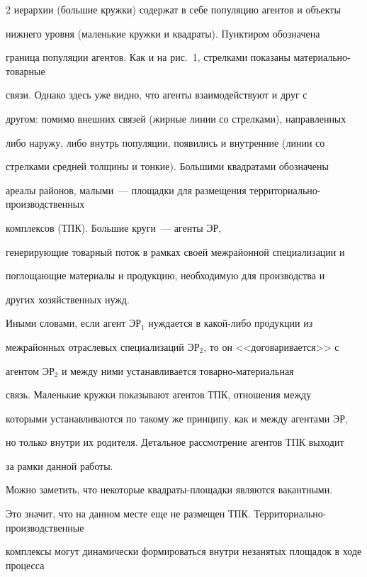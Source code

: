 \begin{multicols}{2}
иерархии (большие кружки) содержат в себе популяцию агентов и объекты 


нижнего уровня (маленькие кружки и квадраты). Пунктиром обозначена 


граница популяции агентов. Как и на рис.~1, стрелками показаны ма\-те\-ри\-аль\-но-то\-вар\-ные 


связи. Однако здесь уже видно, что агенты взаимодействуют и друг с 


другом: помимо внешних связей (жирные линии со стрелками), направленных 


либо наружу, либо внутрь популяции, появились и внутренние (линии со 


стрелками средней толщины и тонкие). Большими квадратами обозначены 


ареалы районов, малыми~--- площадки для размещения тер\-ри\-то\-ри\-аль\-но-про\-из\-вод\-ст\-вен\-ных 


комплексов (ТПК). Большие круги~--- агенты ЭР, 


генерирующие товарный поток в рамках своей межрайонной специализации и 


поглощающие материалы и продукцию, необходимую для производства и 


других хозяйственных нужд.


  


  


  Иными словами, если агент ЭР$_1$ нуждается в какой-либо продукции из 


межрайонных отраслевых специализаций ЭР$_2$, то он <<договаривается>> с 


агентом ЭР$_2$ и между ними устанавливается то\-вар\-но-ма\-те\-ри\-а\-ль\-ная 


связь. Маленькие кружки показывают агентов ТПК, отношения между 


которыми устанавливаются по такому же принципу, как и между агентами ЭР, 


но только внутри их родителя. Детальное рассмотрение агентов ТПК выходит 


за рамки данной работы.


  


  Можно заметить, что некоторые квадраты-пло\-щад\-ки являются вакантными. 


Это значит, что на данном месте еще не размещен ТПК. Тер\-ри\-то\-ри\-аль\-но-про\-из\-вод\-ст\-вен\-ные 


комплексы могут  динамически формироваться внутри незанятых площадок в ходе процесса 



\end{multicols}
